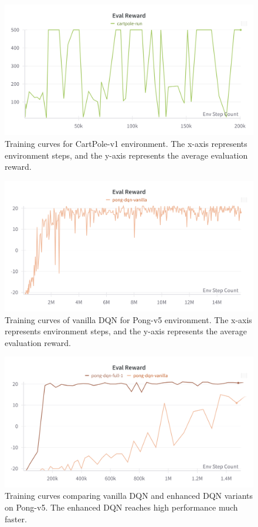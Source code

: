 \documentclass[a4paper]{article}
\begin{document}
\begin{figure}[H]
\centering
\includegraphics[width=0.5\linewidth]{figures/task1-eval}
\caption{Training curves for CartPole-v1 environment. The x-axis represents environment steps, and the y-axis represents the average evaluation reward.}
\label{fig:task1-eval}
\end{figure}
\begin{figure}[H]
\centering
\includegraphics[width=0.5\linewidth]{figures/task2-eval}
\caption{Training curves of vanilla DQN for Pong-v5 environment. The x-axis represents environment steps, and the y-axis represents the average evaluation reward.}
\label{fig:task2-eval}
\end{figure}
\begin{figure}[H]
\centering
\includegraphics[width=0.5\linewidth]{figures/task3-eval}
\caption{Training curves comparing vanilla DQN and enhanced DQN variants on Pong-v5. The enhanced DQN reaches high performance much faster.}
\label{fig:task3-eval}
\end{figure}

%
%
\end{document}
